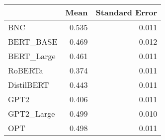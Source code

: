 \begin{tabular}{lrr}
\toprule
{} &   Mean &  Standard Error \\
\midrule
BNC        &  0.535 &           0.011 \\
BERT\_BASE  &  0.469 &           0.012 \\
BERT\_Large &  0.461 &           0.011 \\
RoBERTa    &  0.374 &           0.011 \\
DistilBERT &  0.443 &           0.011 \\
GPT2       &  0.406 &           0.011 \\
GPT2\_Large &  0.499 &           0.010 \\
OPT        &  0.498 &           0.011 \\
\bottomrule
\end{tabular}
